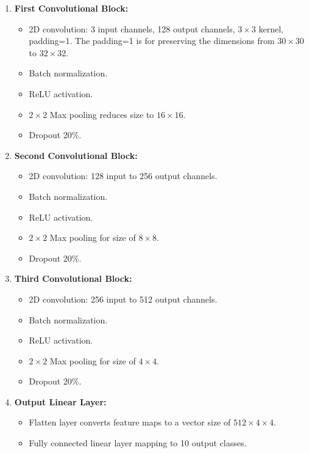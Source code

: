 \documentclass{report}
\begin{document}
\begin{enumerate}
    \item \textbf{First Convolutional Block:}
    \begin{itemize}
        \item 2D convolution: 3 input channels, 128 output channels, $3\times3$ kernel, padding=1. The padding=1 is 
              for preserving the dimensions from $30\times30$ to $32\times32$.
        \item Batch normalization.
        \item ReLU activation.
        \item $2\times2$ Max pooling reduces size to $16\times16$.
        \item Dropout 20\%.
    \end{itemize}
    \item \textbf{Second Convolutional Block:}
    \begin{itemize}
        \item 2D convolution: 128 input to 256 output channels.
        \item Batch normalization.
        \item ReLU activation.
        \item $2\times2$ Max pooling for size of $8\times8$.
        \item Dropout 20\%.
    \end{itemize}
    \item \textbf{Third Convolutional Block:}
    \begin{itemize}
        \item 2D convolution: 256 input to 512 output channels.
        \item Batch normalization.
        \item ReLU activation.
        \item $2\times2$ Max pooling for size of $4\times4$.
        \item Dropout 20\%.
    \end{itemize}
    \item \textbf{Output Linear Layer:}
    \begin{itemize}
        \item Flatten layer converts feature maps to a vector size of $512\times4\times4$.
        \item Fully connected linear layer mapping to 10 output classes.
    \end{itemize}
\end{enumerate}
\end{document}
